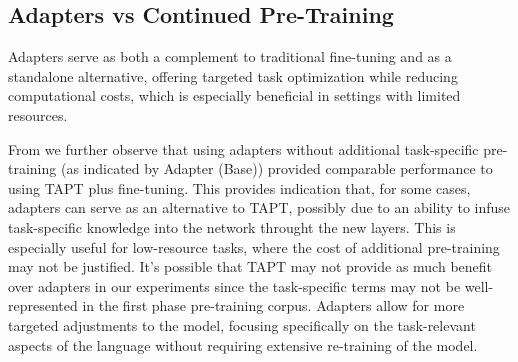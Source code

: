 \documentclass[10pt,twocolumn,letterpaper]{article}
\begin{document}
\subsection{Adapters vs Continued Pre-Training} 

Adapters serve as both a complement to traditional fine-tuning and as a standalone alternative, offering targeted task optimization while reducing computational costs, which is especially beneficial in settings with limited resources.

From  we further observe that using adapters without additional task-specific pre-training (as indicated by Adapter (Base)) provided comparable performance to using TAPT plus fine-tuning. This provides indication that, for some cases, adapters can serve as an alternative to TAPT, possibly due to an ability to infuse task-specific knowledge into the network throught the new layers. This is especially useful for low-resource tasks, where the cost of additional pre-training may not be justified. It's possible that TAPT may not provide as much benefit over adapters in our experiments since the task-specific terms may not be well-represented in the first phase pre-training corpus. Adapters allow for more targeted adjustments to the model, focusing specifically on the task-relevant aspects of the language without requiring extensive re-training of the model.
\end{document}
